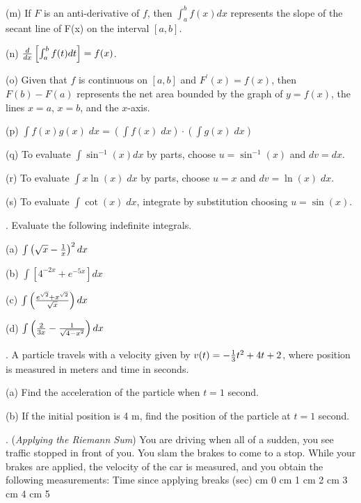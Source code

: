 \documentclass[12pt]{article}
\begin{document}
\noindent (m) If $F$ is an anti-derivative of $f$, then $\int_a^b f(x) dx$ 
represents the slope of the secant line of F(x) on the interval $[a,b]$.

\noindent (n) ${{d}\over{dx}} \left [ \int_a^b f(t) dt \right ] = f(x)$.

\noindent (o) Given that $f$ is continuous on $[a,b]$ and $F^{\prime}(x) = f(x)$, 
then $F(b)-F(a)$ represents the 
net area bounded by the graph of $y=f(x)$, the lines $x=a$, $x=b$, and the 
$x$-axis.

\noindent (p) $\int f(x) g(x) \; dx = \left ( \int f(x) \; dx \right ) \cdot \left 
( \int g(x) \; dx \right )$

\noindent (q) To evaluate $\int \sin^{-1} (x) dx$ by parts, choose $u=\sin^{-1} 
(x)$ and $dv = dx$.

\noindent (r) To evaluate $\int x \ln (x) \; dx$ by parts, choose $u=x$ and $dv = 
\ln (x) \; dx$.

\noindent (s) To evaluate $\int \cot(x) \; dx$, integrate by substitution choosing 
$u=\sin (x)$.

\vskip 1in

. Evaluate the following indefinite integrals.

\noindent (a) $\int \left ( \sqrt{x} - {{1}\over{x}} \right )^2 dx$

\noindent (b) $\int \left [ 4^{-2x} + e^{-5x}  \right ] dx$

\noindent (c)  $\int \left ( {{e^{\sqrt{2}} +  
x^{\sqrt{2}}}\over{\sqrt{x}}} \right ) dx$

\noindent (d) $\int \left ( {{2}\over{3x}} - 
{{1}\over{\sqrt{4-x^2}}} \right ) dx$

\bigskip
{}. A particle travels with a velocity given by $v(t) = 
-{{1}\over{3}} t^2 + 4t +2$, where position is measured in meters and time in 
seconds.  
 
\noindent (a) Find the acceleration of the particle when $t=1$ second.

\noindent (b) If the initial position is 4 m, find the position of the 
particle at $t=1$ second.

\bigskip
{}.  ({\it Applying the Riemann Sum\/})
You are driving when all of a sudden, you see traffic stopped in front of 
you.  You slam the brakes to come to a stop.  While your brakes are 
applied, the velocity of the car is measured, and you obtain the 
following measurements:
\medskip
Time since applying breaks (sec)  cm 0  cm 1  cm 2  cm 3  cm 4  cm 5
\end{document}
